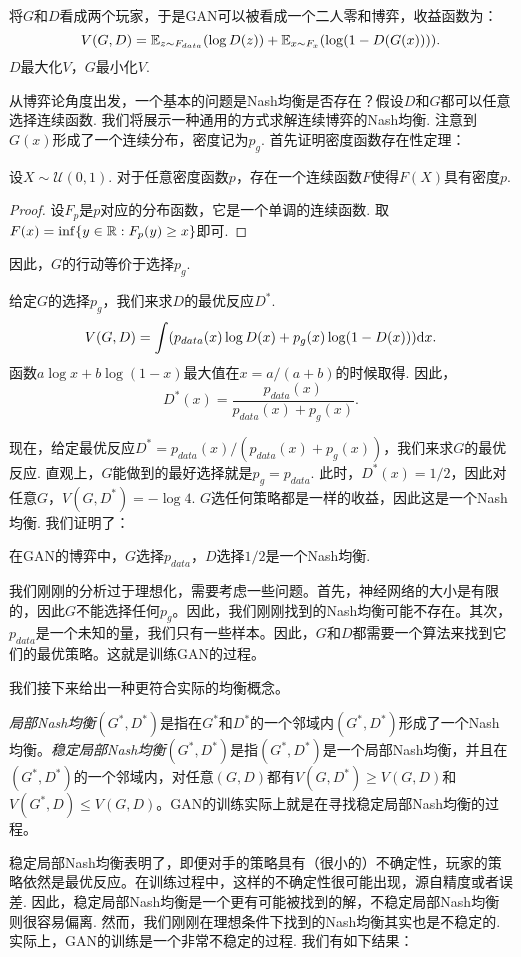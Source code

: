 将$G$和$D$看成两个玩家，于是GAN可以被看成一个二人零和博弈，收益函数为：
    \[
        V(G,D)=\mathbb{E}_{z\sim F_{data}}(\log D(z))+\mathbb{E}_{x\sim F_x}(\log(1-D(G(x)))).
    \]
$D$最大化$V$，$G$最小化$V$.

从博弈论角度出发，一个基本的问题是Nash均衡是否存在？假设$D$和$G$都可以任意选择连续函数. 我们将展示一种通用的方式求解连续博弈的Nash均衡. 注意到$G(x)$形成了一个连续分布，密度记为$p_g$.  首先证明密度函数存在性定理：
\begin{theorem}
设$X\sim \mathcal U(0,1)$. 对于任意密度函数$p$，存在一个连续函数$F$使得$F(X)$具有密度$p$.
\end{theorem}
\begin{proof}
设$F_p$是$p$对应的分布函数，它是一个单调的连续函数. 取$F(x)=\inf\{y\in \mathbb{R}: F_p(y)\geq x\}$即可.
\end{proof}
因此，$G$的行动等价于选择$p_g$.

给定$G$的选择$p_g$，我们来求$D$的最优反应$D^*$.
    \[V(G,D)=\int (p_{data}(x)\log D(x)+p_g(x)\log(1-D(x)))\mathrm{d} x.\]
函数$a\log x+b\log(1-x)$最大值在$x=a/(a+b)$的时候取得. 因此，
    \[D^*(x)=\frac{p_{data}(x)}{p_{data}(x)+p_g(x)}.\]
    
现在，给定最优反应$D^*=p_{data}(x)/(p_{data}(x)+p_g(x))$，我们来求$G$的最优反应. 直观上，$G$能做到的最好选择就是$p_g=p_{data}$. 此时，$D^*(x)=1/2$，因此对任意$G$，$V(G,D^*)=-\log 4$. $G$选任何策略都是一样的收益，因此这是一个Nash均衡. 我们证明了：
\begin{theorem}[GAN的Nash均衡存在性]
在GAN的博弈中，$G$选择$p_{data}$，$D$选择$1/2$是一个Nash均衡.
\end{theorem}

我们刚刚的分析过于理想化，需要考虑一些问题。首先，神经网络的大小是有限的，因此$G$不能选择任何$p_g$。因此，我们刚刚找到的Nash均衡可能不存在。其次，$p_{data}$是一个未知的量，我们只有一些样本。因此，$G$和$D$都需要一个算法来找到它们的最优策略。这就是训练GAN的过程。

我们接下来给出一种更符合实际的均衡概念。

\emph{局部Nash均衡}$(G^*, D^*)$是指在$G^*$和$D^*$的一个邻域内$(G^*, D^*)$形成了一个Nash均衡。\emph{稳定局部Nash均衡}$(G^*, D^*)$是指$(G^*, D^*)$是一个局部Nash均衡，并且在$(G^*,D^*)$的一个邻域内，对任意$(G,D)$都有$V(G,D^*)\geq V(G,D)$和$V(G^*,D)\leq V(G,D)$。GAN的训练实际上就是在寻找稳定局部Nash均衡的过程。

稳定局部Nash均衡表明了，即便对手的策略具有（很小的）不确定性，玩家的策略依然是最优反应。在训练过程中，这样的不确定性很可能出现，源自精度或者误差. 因此，稳定局部Nash均衡是一个更有可能被找到的解，不稳定局部Nash均衡则很容易偏离. 然而，我们刚刚在理想条件下找到的Nash均衡其实也是不稳定的. 实际上，GAN的训练是一个非常不稳定的过程. 我们有如下结果：

